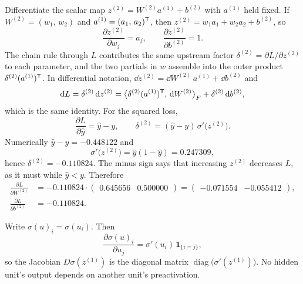 
Differentiate the scalar map \(z^{(2)} = W^{(2)} a^{(1)} + b^{(2)}\) with \(a^{(1)}\) held fixed. If \(W^{(2)} = (w_1,\, w_2)\) and \(a^{(1)} = (a_1,\, a_2)^{\mathsf{T}}\), then \(z^{(2)} = w_1 a_1 + w_2 a_2 + b^{(2)}\), so
\[
  \frac{\partial z^{(2)}}{\partial w_j} = a_j,
  \qquad
  \frac{\partial z^{(2)}}{\partial b^{(2)}} = 1.
\]
The chain rule through \(L\) contributes the same upstream factor \(\delta^{(2)} = \partial L/\partial z^{(2)}\) to each parameter, and the two partials in \(w\) assemble into the outer product \(\delta^{(2)}(a^{(1)})^{\mathsf{T}}\). In differential notation, \(\dd z^{(2)} = \dd W^{(2)}\, a^{(1)} + \dd b^{(2)}\) and
\[
  \mathrm{d} L = \delta^{(2)}\,\mathrm{d} z^{(2)}
  = \bigl\langle \delta^{(2)}(a^{(1)})^{\mathsf{T}},\, \mathrm{d} W^{(2)}\bigr\rangle_F
  + \delta^{(2)}\,\mathrm{d} b^{(2)},
\]
which is the same identity. For the squared loss,
\[
  \frac{\partial L}{\partial \hat y} = \hat y - y,
  \qquad
  \delta^{(2)} = (\hat y - y)\,\sigma'\bigl(z^{(2)}\bigr).
\]
Numerically \(\hat y - y = -0.448122\) and
\[
  \sigma'\bigl(z^{(2)}\bigr) = \hat y(1-\hat y) = 0.247309,
\]
hence \(\delta^{(2)} = -0.110824\). The minus sign says that increasing \(z^{(2)}\) decreases \(L\), as it must while \(\hat y < y\). Therefore
\begin{align*}
  \frac{\partial L}{\partial W^{(2)}}
  &=
  -0.110824\cdot\begin{pmatrix} 0.645656 & 0.500000 \end{pmatrix}
  =
  \begin{pmatrix} -0.071554 & -0.055412 \end{pmatrix},
  \\[0.3em]
  \frac{\partial L}{\partial b^{(2)}}
  &= -0.110824.
\end{align*}


Write \(\sigma(u)_i = \sigma(u_i)\). Then
\[
  \frac{\partial \sigma(u)_i}{\partial u_j}
  =
  \sigma'(u_i)\,\mathbf{1}_{\{i=j\}},
\]
so the Jacobian \(D\sigma(z^{(1)})\) is the diagonal matrix \(\operatorname{diag}\bigl(\sigma'(z^{(1)})\bigr)\). No hidden unit's output depends on another unit's preactivation.

